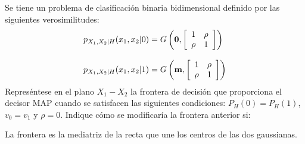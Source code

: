 \ifspanish

\question Se tiene un problema de clasificación binaria bidimensional definido por las siguientes verosimilitudes:
 $$ \begin{array}{l} 
					   p_{X_1,X_2|H}(x_1,x_2 | 0) = G \left( {\bf 0}, \left[ \begin{array}{cc}  
					   1 & \rho \\ \rho & 1					   
					    \end{array}  \right] \right)\\ \\
					  p_{X_1,X_2|H}(x_1,x_2 | 1) = G \left( {\bf m}, \left[ \begin{array}{cc}  
					   1 & \rho \\ \rho & 1					   
					    \end{array}  \right] \right)	  
  \end{array}$$
Represéntese en el plano $X_1-X_2$ la frontera de decisión que proporciona el decisor MAP cuando se satisfacen las siguientes condiciones: $P_H(0)= P_H (1)$, $v_0=v_1$ y $\rho=0$.
Indique cómo se modificaría la frontera anterior si:
\begin{solution} 
La frontera es la mediatriz de la recta que une los centros de las dos gaussianas.
\end{solution}

\else

